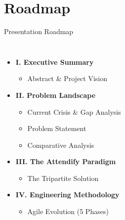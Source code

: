 \documentclass[11pt, aspectratio=169]{beamer}
\begin{document}
\section{Roadmap}
\begin{frame}{Presentation Roadmap}
    \begin{columns}[t]
        \begin{itemize}
            \item \textbf{I. Executive Summary}
            \begin{itemize}
                \item Abstract \& Project Vision
            \end{itemize}
            \item \textbf{II. Problem Landscape}
            \begin{itemize}
                \item Current Crisis \& Gap Analysis
                \item Problem Statement
                \item Comparative Analysis
            \end{itemize}
            \item \textbf{III. The Attendify Paradigm}
            \begin{itemize}
                \item The Tripartite Solution
            \end{itemize}
            \item \textbf{IV. Engineering Methodology}
            \begin{itemize}
                \item Agile Evolution (5 Phases)
            \end{itemize}
        \end{itemize}
        

\end{columns}
\end{frame}
\end{document}
